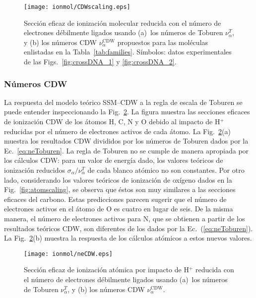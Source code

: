 \begin{figure}[t]
\centering
\texttt{[image: ionmol/CDWscaling.eps]}
\caption[Sección eficaz de ionización molecular reducida por $n_e$.]
{Sección eficaz de ionización molecular reducida con el número de 
electrones débilmente ligados usando 
(a)~los números de Toburen $\nu_{\alpha}^T$, y 
(b) los números CDW $\nu_{\alpha}^{\text{CDW}}$ propuestos para las 
moléculas enlistadas en la Tabla~\ref{tab:families}. 
Símbolos: datos experimentales de las Figs.~\ref{fig:crossDNA_1} y 
\ref{fig:crossDNA_2}.}
\label{fig:newscaling}
\end{figure}

\subsubsection*{Números CDW}
\label{subsec:CDW}

La respuesta del modelo teórico SSM--CDW a la regla de escala de Toburen 
se puede entender inspeccionando la Fig.~\ref{fig:neCDW}. La figura 
muestra las secciones eficaces de ionización CDW de los átomos H, C, N y 
O debido al impacto de H$^+$ reducidas por el número de electrones 
activos de cada átomo. La Fig.~\ref{fig:neCDW}(a) muestra los resultados 
CDW divididos por los números de Toburen dados por la 
Ec.~\ref{eq:neToburen}. La regla de Toburen no se cumple de manera 
apropiada por los cálculos CDW: para un valor de energía dado, los 
valores teóricos de ionización reducidos 
$\sigma_{\alpha}/\nu_{\alpha}^T$ de cada blanco atómico no son 
constantes. Por otro lado, considerando los valores teóricos de 
ionización de oxígeno dados en la Fig.~\ref{fig:atomscaling}, se observa 
que éstos son muy similares a las secciones eficaces del carbono. Estas 
predicciones parecen sugerir que el número de electrones activos en el 
átomo de O es cuatro en lugar de seis. De la misma manera, el número de 
electrones activos para N, que se obtienen a partir de los resultados 
teóricos CDW, son diferentes de los dados por la 
Ec.~(\ref{eq:neToburen}). La Fig.~\ref{fig:neCDW}(b) muestra la 
respuesta de los cálculos atómicos a estos nuevos valores.

\begin{figure}[t]
\centering
\texttt{[image: ionmol/neCDW.eps]}
\caption[Sección eficaz de ionización atómica reducida por $n_e$.]
{Sección eficaz de ionización atómica por impacto de H$^+$ reducida con 
el número de electrones débilmente ligados usando 
(a)~los números de Toburen $\nu_{\alpha}^T$, y 
(b) los números CDW $\nu_{\alpha}^{\text{CDW}}$.}
\label{fig:neCDW}
\end{figure}

